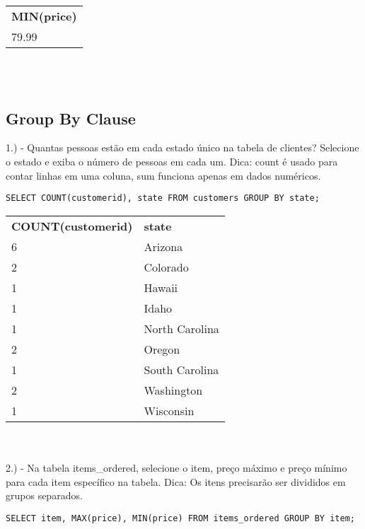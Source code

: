 \begin{tabular}{l}
    {\textbf{MIN(price)}}       \\
    {79.99}
\end{tabular} \\ \\

\subsection{Group By Clause}

1.) - Quantas pessoas estão em cada estado único na tabela de clientes? Selecione o estado e exiba o número de pessoas em cada um. Dica: count é usado para contar linhas em uma coluna, sum funciona apenas em dados numéricos.


\begin{lstlisting}
SELECT COUNT(customerid), state FROM customers GROUP BY state;
\end{lstlisting}

\begin{tabular}{l l}
    {\textbf{COUNT(customerid)}} & {\textbf{state}} \\
    {6}                          & {Arizona}        \\
    {2}                          & {Colorado}       \\
    {1}                          & {Hawaii}         \\
    {1}                          & {Idaho}          \\
    {1}                          & {North Carolina} \\
    {2}                          & {Oregon}         \\
    {1}                          & {South Carolina} \\
    {2}                          & {Washington}     \\
    {1}                          & {Wisconsin}     
\end{tabular} \\ \\

2.) - Na tabela items\_ordered, selecione o item, preço máximo e preço mínimo para cada item específico na tabela. Dica: Os itens precisarão ser divididos em grupos separados.

\begin{lstlisting}
SELECT item, MAX(price), MIN(price) FROM items_ordered GROUP BY item;
\end{lstlisting}

